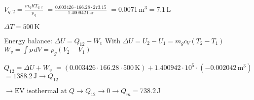 \( V_{g,2} = \frac{m_{g} R T_{g,2}}{p_{g}} \)  
\( = \frac{0.003426 \cdot 166.28 \cdot 273.15}{1.400942 \, \text{bar}} \)  
\( = 0.0071 \, \text{m}^3 = 7.1 \, \text{L} \)  

\( \Delta T = 500 \, \text{K} \)  

Energy balance:  
\( \Delta U = Q_{12} - W_{v} \)  
With \( \Delta U = U_{2} - U_{1} = m_{g} c_{V} (T_{2} - T_{1}) \)  
\( W_{v} = \int p \, dV = p_{g} (V_{2} - V_{1}) \)  

\( Q_{12} = \Delta U + W_{v} \)  
\( = (0.003426 \cdot 166.28 \cdot 500 \, \text{K}) + 1.400942 \cdot 10^5 \cdot (-0.002042 \, \text{m}^3) \)  
\( = 1388.2 \, \text{J} \rightarrow Q_{12} \)  

\( \rightarrow \text{EV isothermal at } Q \rightarrow Q_{12} \rightarrow 0 \rightarrow Q_{m} = 738.2 \, \text{J} \)